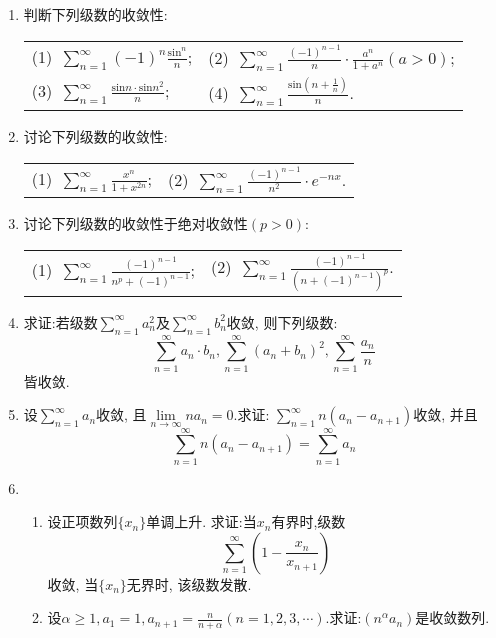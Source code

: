 \begin{enumerate}
\begin{table}[H]
\begin{tabular}{ll}
			\end{tabular}
	\end{table}
\item 判断下列级数的收敛性:
\begin{table}[H]
	\begin{tabular}{ll}
(1)\ $\sum\limits_{n=1}^{\infty}(-1)^n\frac{\mathrm{sin}^n}{n}$;\qquad \qquad \qquad \qquad &(2)\ $\sum\limits_{n=1}^{\infty}\frac{(-1)^{n-1}}{n}\cdot \frac{a^n}{1+a^n}(a>0)$;\\
(3)\ $\sum\limits_{n=1}^{\infty}\frac{\mathrm{sin}n\cdot\mathrm{sin}n^2}{n}$;\qquad \qquad \qquad \qquad &(4)\ $\sum\limits_{n=1}^{\infty}\frac{\mathrm{sin}(n+\frac{1}{n})}{n}$.
	\end{tabular}
\end{table}
\item 讨论下列级数的收敛性:
\begin{table}[H]
	\begin{tabular}{ll}
		(1)\ $\sum\limits_{n=1}^{\infty}\frac{x^n}{1+x^{2n}}$;\qquad \qquad \qquad \qquad &(2)\ $\sum\limits_{n=1}^{\infty}\frac{(-1)^{n-1}}{n^2}\cdot e^{-nx}$.
	\end{tabular}
\end{table}
\item 讨论下列级数的收敛性于绝对收敛性$(p>0)$:
\begin{table}[H]
	\begin{tabular}{ll}
		(1)\ $\sum\limits_{n=1}^{\infty}\frac{(-1)^{n-1}}{n^p+(-1)^{n-1}}$;\qquad \qquad \qquad \qquad &(2)\ $\sum\limits_{n=1}^{\infty}\frac{(-1)^{n-1}}{(n+(-1)^{n-1})^p}$.
	\end{tabular}
\end{table}
\item 求证:若级数$\sum\limits_{n=1}^{\infty}a_n^2$及$\sum\limits_{n=1}^{\infty}b_n^2$收敛, 则下列级数:
$$ \sum\limits_{n=1}^{\infty}a_n \cdot b_n, \sum\limits_{n=1}^{\infty}(a_n+b_n)^2,\sum\limits_{n=1}^{\infty}\frac{a_n}{n}$$
皆收敛.
\item 设$\sum\limits_{n=1}^{\infty}a_n$收敛, 且$\lim\limits_{n\rightarrow \infty}na_n=0$.求证: $\sum\limits_{n=1}^{\infty}n(a_n-a_{n+1})$收敛, 并且$$
\sum\limits_{n=1}^{\infty}n(a_n-a_{n+1})=\sum\limits_{n=1}^{\infty}a_n$$
\item 
\begin{enumerate}
	\item 设正项数列$\{x_n\}$单调上升. 求证:当${x_n}$有界时,级数$$
	\sum\limits_{n=1}^{\infty}(1-\frac{x_n}{x_{n+1}})$$
	收敛, 当$\{x_n\}$无界时, 该级数发散.
	\item 设$\alpha\ge 1,a_1=1,a_{n+1}=\frac{n}{n+\alpha}(n=1,2,3,\cdots)$.求证:$(n^\alpha a_n)$是收敛数列.

\end{enumerate}
\end{enumerate}
